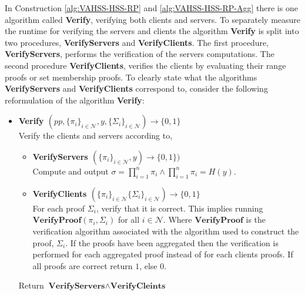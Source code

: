 In Construction \ref{alg:VAHSS-HSS-RP} and \ref{alg:VAHSS-HSS-RP-Agg} there is one algorithm called \textbf{Verify}, verifying both clients and servers.
To separately measure the runtime for verifying the servers and clients the  algorithm \textbf{Verify} is split into two procedures, \textbf{VerifyServers} and \textbf{VerifyClients}. The first procedure, \textbf{VerifyServers}, performs the verification of the servers computations. The second procedure  \textbf{VerifyClients}, verifies the clients by evaluating their range proofs or set membership proofs. To clearly state what the algorithms \textbf{VerifyServers} and \textbf{VerifyClients} correspond to, consider the following reformulation of the algorithm \textbf{Verify}: 
\begin{itemize}
 \item\textbf{Verify $(pp, \{\pi_i\}_{i\in\mathcal{N}},y,\{\Sigma_i\}_{i\in\mathcal{N}})\xrightarrow[]{}\{0,1\}$}\\
 Verify the clients and servers according to, 
 	\begin{itemize}
 	\item \textbf{VerifyServers $(\{\pi_i\}_{i\in\mathcal{N}},y)\xrightarrow[]{}\{0,1\})$}\\
 Compute and output $\sigma= \prod_{i=1}^n \pi_i \wedge \prod_{i=1}^n \pi_i = H(y)$.
 \item \textbf{VerifyClients $(\{\pi_i\}_{i\in\mathcal{N}}\{\Sigma_i\}_{i\in\mathcal{N}})\xrightarrow[]{}\{0,1\}$ }\\
 For each proof $\Sigma_i$, verify that it is correct. This implies running  $\textbf{VerifyProof}(\pi_i, \Sigma_i)$ for all $i\in\mathcal{N}$. Where $\textbf{VerifyProof}$ is the verification algorithm associated with the algorithm used to construct the proof, $\Sigma_i$. If the proofs have been aggregated then the verification is performed for each aggregated proof instead of for each clients proofs. If all proofs are correct return $1$, else $0$.  
 \end{itemize}
Return  $\textbf{VerifyServers}\wedge \textbf{VerifyCleints}$
\end{itemize}

